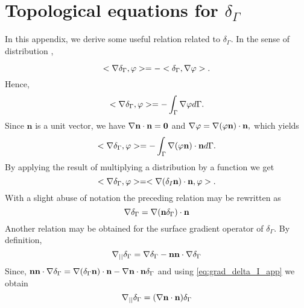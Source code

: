 \section{Topological equations for $\delta_\Gamma$}
\label{ap:delta_I}
In this appendix, we derive some useful relation related to $\delta_\Gamma$. In the sense of distribution \citep{appel2007}, 

\begin{equation}
<\mathbf{\nabla} \delta_\Gamma,\varphi> = - <\delta_\Gamma,\mathbf{\nabla} \varphi>.
\end{equation}
Hence,
\begin{equation}
<\grad \delta_\Gamma,\varphi> = - \int_{\Gamma} \grad \varphi d\Gamma.
\label{eq:1grad_delta_I}
\end{equation}
Since $\textbf{n}$ is a unit vector, we have $\mathbf{\nabla}  \textbf{n} \cdot \textbf{n} =\bm 0$ and%
$\mathbf{\nabla} \varphi= \mathbf{\nabla}  (\varphi \textbf{n}) \cdot \textbf{n},$
which yields 
\begin{equation}
<\mathbf{\nabla} \delta_\Gamma,\varphi> = - \int_{\Gamma} \mathbf{\nabla}  (\varphi \textbf{n}) \cdot \textbf{n} d\Gamma. 
\end{equation}
By applying the result of multiplying a distribution by a function we get \citep{appel2007} %
\begin{equation}
<\mathbf{\nabla} \delta_\Gamma,\varphi> = <\mathbf{\nabla}  (\delta _I \textbf{n}) \cdot \textbf{n},\varphi>.
\end{equation}
With a slight abuse of notation the preceding relation may be rewritten as
\begin{equation}
    \grad\delta_\Gamma 
    =   \grad  (\textbf{n} \delta_\Gamma) \cdot \textbf{n}
    \label{eq:grad_delta_I_app}
\end{equation}
Another relation may be obtained for the surface gradient operator of $\delta_\Gamma$. By definition,
\begin{equation}
  \mathbf{\nabla}_{||} \delta_\Gamma  = \mathbf{\nabla}\delta_\Gamma - \textbf{nn}\cdot\mathbf{\nabla}\delta_\Gamma
\end{equation}
Since, $\textbf{nn}\cdot\mathbf{\nabla}\delta_\Gamma = \mathbf{\nabla}  (\delta_\Gamma\textbf{n})\cdot \textbf{n}-\mathbf{\nabla} \textbf{n}\cdot \textbf{n} \delta_\Gamma$ and using \ref{eq:grad_delta_I_app} we obtain
\begin{equation}
  \gradI \delta_\Gamma  = (\grad \textbf{n}\cdot \textbf{n}) \delta_\Gamma
\label{eq:gradI_deltaI}
\end{equation}


